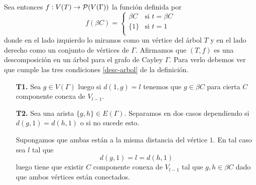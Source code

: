 \documentclass[tesis.tex]{subfiles}
\begin{document}
\begin{deff}
		
	  
	Sea entonces $f: V(T) \to {\cal{P}}(V(\Gamma))$ la función definida por 
	\[
		f(\beta C) =
		\begin{cases}
			\beta C & \text{si $t = \beta C$} \\
			\{1\}       & \text{si $t = 1$   } \\
		\end{cases}
	\]
	 donde en el lado izquierdo lo miramos como un vértice del árbol $T$ y en el lado derecho como un conjunto de vértices de $\Gamma$.
	Afirmamos que $(T,f)$ es una descomposición en un árbol para el grafo de Cayley $\Gamma$.
	Para verlo debemos ver que cumple las tres condiciones \ref{desc-arbol} de la definición. 
	\begin{enumerate}
		\item[\textbf{T1.}] Sea $g \in V(\Gamma)$ luego si $d(1,g) = l$
		tenemos que $g \in \beta C$ para cierta $C$ componente conexa de 
		$V_{l-1}$.		 
		
		
		\item[\textbf{T2.}] Sea una arista $\{g,h\} \in E(\Gamma)$. 
		Separamos en dos casos dependiendo si $d(g,1) = d(h,1)$ o si no sucede esto.
		
		Supongamos que ambas están a la misma distancia del vértice $1$. 
		En tal caso sea $l$ tal que 
		\[
			d(g,1)= l = d(h,1)
		\] 
		luego tiene que existir $C$ componente conexa de $V_{l-1}$ 
		tal que $g,h \in \beta C$ dado que ambos vértices están conectados.
		

\end{enumerate}
\end{deff}
\end{document}
